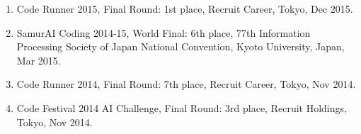 \begin{enumerate}
 \item Code Runner 2015, Final Round: 1st place, Recruit Career, Tokyo, Dec 2015.
 \item SamurAI Coding 2014-15, World Final: 6th place, 77th Information Processing Society of Japan National Convention, Kyoto University, Japan, Mar 2015.
 \item Code Runner 2014, Final Round: 7th place, Recruit Career, Tokyo, Nov 2014.
 \item Code Festival 2014 AI Challenge, Final Round: 3rd place, Recruit Holdings, Tokyo, Nov 2014.
\end{enumerate}

\vspace{0.4cm}